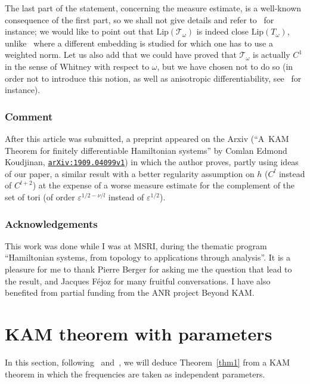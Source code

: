 \documentclass[11pt]{article}
\let\mathcal\mathscr
\providecommand{\eprint}[1]{\href{http://arxiv.org/abs/#1}{\texttt{arXiv\string:\allowbreak#1}}}
\numberwithin{equation}{section}
\theoremstyle{plain}
\theoremstyle{definition}
\begin{document}
The last part of the statement, concerning the measure estimate, is a well-known consequence of the first part, so we shall not give details and refer to~\cite{Pos01} for instance; we would like to point out that $\mathrm{Lip}(\mathcal{T}_\omega)$ is indeed close $\mathrm{Lip}(T_\omega)$, unlike~\cite{Pos01} where a different embedding is studied for which one has to use a weighted norm. Let us also add that we could have proved that $\mathcal{T}_\omega$ is actually $C^1$ in the sense of Whitney with respect to $\omega$, but we have chosen not to do so (in order not to introduce this notion, as well as anisotropic differentiability, see~\cite{Pos82} for instance).

\subsubsection*{Comment} After this article was submitted, a preprint appeared on the Arxiv (``A~KAM Theorem for finitely differentiable Hamiltonian systems'' by Comlan Edmond Koudjinan, \eprint{1909.04099v1}) in which the author proves, partly using ideas of our paper, a similar result with a better regularity assumption on $h$ ($C^l$ instead of $C^{l+2}$) at the expense of a worse measure estimate for the complement of the set of tori (of order $\varepsilon^{1/2-\nu/l}$ instead of $\varepsilon^{1/2}$).

\subsubsection*{Acknowledgements} This work was done while I was at MSRI, during the thematic program ``Hamiltonian systems, from topology to applications through analysis''. It is a pleasure for me to thank Pierre Berger for asking me the question that lead to the result, and Jacques Féjoz for many fruitful conversations. I have also benefited from partial funding from the ANR project Beyond KAM.

\section{KAM theorem with parameters}\label{s2}

In this section, following~\cite{Pos01} and~\cite{Pop04}, we will deduce Theorem~\ref{thm1} from a KAM theorem in which the frequencies are taken as independent parameters.
\end{document}
